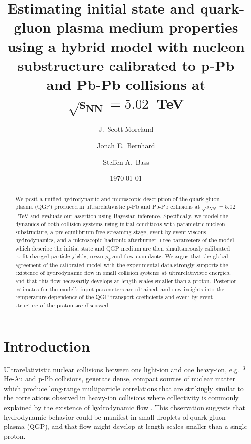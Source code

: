 \documentclass[aps,prc,reprint,amsmath,nofootinbib]{revtex4-1}
\newcommand{\sqrts}{\sqrt{s_{NN}}}
\def\\#1{ #1}
\begin{document}
\title{
  Estimating initial state and quark-gluon plasma medium properties \\
  using a hybrid model with nucleon substructure \\
  calibrated to p-Pb and Pb-Pb collisions at \texorpdfstring{$\mathbf{\sqrts=5.02}$}{}~TeV
}

\author{J.\ Scott Moreland}
\author{Jonah E.\ Bernhard}
\author{Steffen A.\ Bass}


\date{\today}

\begin{abstract}
We posit a unified hydrodynamic and microscopic description of the quark-gluon plasma (QGP) produced in ultrarelativistic p-Pb and Pb-Pb collisions at $\sqrts=5.02$~TeV and evaluate our assertion using Bayesian inference. Specifically, we model the dynamics of both collision systems using initial conditions with parametric nucleon substructure, a pre-equilibrium free-streaming stage, event-by-event viscous hydrodynamics, and a microscopic hadronic afterburner.
Free parameters of the model which describe the initial state and QGP medium are then simultaneously calibrated to fit charged particle yields, mean $p_T$ and flow cumulants.
We argue that the global agreement of the calibrated model with the experimental data strongly supports the existence of hydrodynamic flow in small collision systems at ultrarelativistic energies, and that this flow necessarily develops at length scales smaller than a proton.
Posterior estimates for the model's input parameters are obtained, and new insights into the temperature dependence of the QGP transport coefficients and event-by-event structure of the proton are discussed.
\end{abstract}

\maketitle


\section{Introduction}

Ultrarelativistic nuclear collisions between one light-ion and one heavy-ion, e.g.\ $^3$He-Au and p-Pb collisions, generate dense, compact sources of nuclear matter which produce long-range multiparticle correlations that are strikingly similar to the correlations observed in heavy-ion collisions where collectivity is commonly explained by the existence of hydrodynamic flow \cite{CMS:2012qk, Abelev:2012ola, Aad:2012gla, Adare:2015ctn}.
This observation suggests that hydrodynamic behavior could be manifest in small droplets of quark-gluon-plasma (QGP), and that flow might develop at length scales smaller than a single proton.
\end{document}
